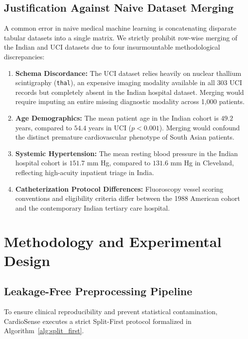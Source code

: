\documentclass[conference]{IEEEtran}
\begin{document}
\subsection{Justification Against Naive Dataset Merging}
A common error in naive medical machine learning is concatenating disparate tabular datasets into a single matrix. We strictly prohibit row-wise merging of the Indian and UCI datasets due to four insurmountable methodological discrepancies:
\begin{enumerate}
    \item \textbf{Schema Discordance:} The UCI dataset relies heavily on nuclear thallium scintigraphy (\texttt{thal}), an expensive imaging modality available in all 303 UCI records but completely absent in the Indian hospital dataset. Merging would require imputing an entire missing diagnostic modality across 1,000 patients.
    \item \textbf{Age Demographics:} The mean patient age in the Indian cohort is $49.2$ years, compared to $54.4$ years in UCI ($p < 0.001$). Merging would confound the distinct premature cardiovascular phenotype of South Asian patients.
    \item \textbf{Systemic Hypertension:} The mean resting blood pressure in the Indian hospital cohort is $151.7$ mm Hg, compared to $131.6$ mm Hg in Cleveland, reflecting high-acuity inpatient triage in India.
    \item \textbf{Catheterization Protocol Differences:} Fluoroscopy vessel scoring conventions and eligibility criteria differ between the 1988 American cohort and the contemporary Indian tertiary care hospital.
\end{enumerate}

\section{Methodology and Experimental Design}

\subsection{Leakage-Free Preprocessing Pipeline}
To ensure clinical reproducibility and prevent statistical contamination, CardioSense executes a strict Split-First protocol formalized in Algorithm~\ref{alg:split_first}.
\end{document}
